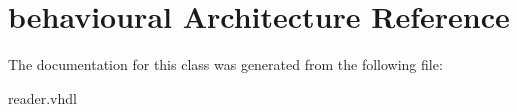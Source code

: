 \hypertarget{classreader_1_1behavioural}{}\section{behavioural Architecture Reference}
\label{classreader_1_1behavioural}


The documentation for this class was generated from the following file\+:\begin{DoxyCompactItemize}
\item 
reader.\+vhdl\end{DoxyCompactItemize}
